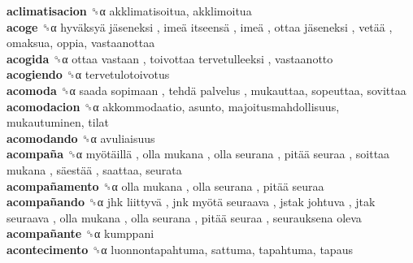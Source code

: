 \textbf{aclimatisacion} ␝α  akklimatisoitua, akklimoitua  \\
\textbf{acoge} ␝α   hyväksyä jäseneksi ,  imeä itseensä ,  imeä ,  ottaa jäseneksi ,  vetää , omaksua, oppia, vastaanottaa  \\
\textbf{acogida} ␝α   ottaa vastaan ,  toivottaa tervetulleeksi , vastaanotto  \\
\textbf{acogiendo} ␝α  tervetulotoivotus  \\
\textbf{acomoda} ␝α   saada sopimaan ,  tehdä palvelus , mukauttaa, sopeuttaa, sovittaa  \\
\textbf{acomodacion} ␝α  akkommodaatio, asunto, majoitusmahdollisuus, mukautuminen, tilat  \\
\textbf{acomodando} ␝α  avuliaisuus  \\
\textbf{acompaña} ␝α   myötäillä ,  olla mukana ,  olla seurana ,  pitää seuraa ,  soittaa mukana ,  säestää , saattaa, seurata  \\
\textbf{acompañamento} ␝α   olla mukana ,  olla seurana ,  pitää seuraa   \\
\textbf{acompañando} ␝α   jhk liittyvä ,  jnk myötä seuraava ,  jstak johtuva ,  jtak seuraava ,  olla mukana ,  olla seurana ,  pitää seuraa ,  seurauksena oleva   \\
\textbf{acompañante} ␝α  kumppani  \\
\textbf{acontecimento} ␝α  luonnontapahtuma, sattuma, tapahtuma, tapaus  \\
